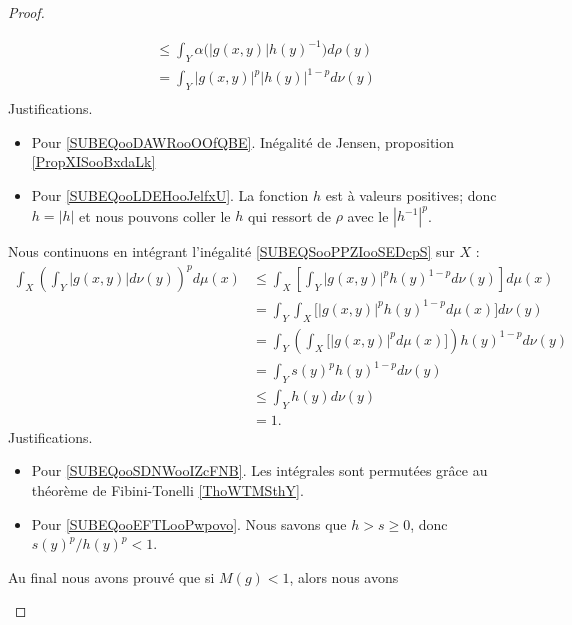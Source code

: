 \begin{proof}
\begin{subproof}
\begin{subequations}
\begin{align}
                &\leq \int_Y\alpha\big( |g(x,y)|h(y)^{-1} \big)d\rho(y)       \label{SUBEQooDAWRooOOfQBE}\\
                &=\int_Y| g(x,y) |^p| h(y) |^{1-p}d\nu(y)           \label{SUBEQooLDEHooJelfxU}\\
            \end{align}
        \end{subequations}
        Justifications.
        \begin{itemize}
            \item Pour \eqref{SUBEQooDAWRooOOfQBE}. Inégalité de Jensen, proposition \ref{PropXISooBxdaLk}
            \item Pour \eqref{SUBEQooLDEHooJelfxU}. La fonction \( h\) est à valeurs positives; donc \( h=| h |\) et nous pouvons coller le \( h\) qui ressort de \( \rho\) avec le \( | h^{-1} |^p\).
        \end{itemize}
        Nous continuons en intégrant l'inégalité \eqref{SUBEQSooPPZIooSEDcpS} sur \( X\) :
        \begin{subequations}
            \begin{align}
                \int_X\left( \int_Y| g(x,y) |d\nu(y) \right)^pd\mu(x)&\leq\int_X\left[ \int_Y | g(x,y) |^ph(y)^{1-p}d\nu(y) \right]d\mu(x)\\
                &=\int_Y\int_X\big[ | g(x,y) |^ph(y)^{1-p}d\mu(x) \big]d\nu(y)      \label{SUBEQooSDNWooIZcFNB}\\
                &=\int_Y\left( \int_X\big[ | g(x,y) |^pd\mu(x) \big]\right)h(y)^{1-p}d\nu(y)      \\
                &=\int_Y s(y)^ph(y)^{1-p}d\nu(y)\\
                &\leq \int_Yh(y)d\nu(y)     \label{SUBEQooEFTLooPwpovo}\\
                &=1.
            \end{align}
        \end{subequations}
        Justifications.
        \begin{itemize}
            \item Pour \eqref{SUBEQooSDNWooIZcFNB}. Les intégrales sont permutées grâce au théorème de Fibini-Tonelli \ref{ThoWTMSthY}.
            \item Pour \eqref{SUBEQooEFTLooPwpovo}. Nous savons que \( h>s\geq 0\), donc \( s(y)^p/h(y)^p<1 \).
        \end{itemize}
        Au final nous avons prouvé que si \( M(g)<1\), alors nous avons
        \begin{equation}        \label{EQooTGDMooZGYbGx}

\end{equation}
\end{subproof}
\end{proof}
